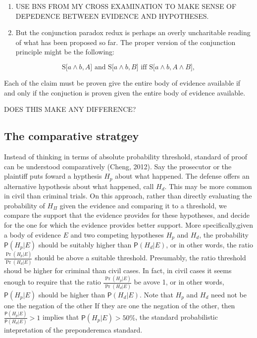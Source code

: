 \documentclass[10pt,dvipsnames,enabledeprecatedfontcommands]{scrartcl}
\newcommand{\et}{\wedge}
\newcommand{\pr}[1]{\mathsf{P}(#1)}
\begin{document}
\begin{enumerate}
\def\labelenumi{(\arabic{enumi})}
\setcounter{enumi}{1}
\item
  USE BNS FROM MY CROSS EXAMINATION TO MAKE SENSE OF DEPEDENCE BETWEEN
  EVIDENCE AND HYPOTHESES.
\item
  But the conjunction paradox redux is perhaps an overly uncharitable
  reading of what has been proposed so far. The proper version of the
  conjunction principle might be the following:
\end{enumerate}

\[\text{S[$a \et b, A$] and S[$a \et b, B$] iff S[$a \wedge b, A\wedge B$]},\]

\noindent
 Each of the claim must be proven give the entire body of evidence
available if and only if the conjuction is proven given the entire body
of evidence available.

DOES THIS MAKE ANY DIFFERENCE?

\subsection{The comparative stratgey}\label{the-comparative-stratgey}

Instead of thinking in terms of absolute probability threshold, standard
of proof can be understood comparatively (Cheng, 2012). Say the
prosecutor or the plaintiff puts foward a hypthesis \(H_p\) about what
happened. The defense offers an alternative hypothesis about what
happened, call \(H_d\). This may be more common in civil than criminal
trials. On this approach, rather than directly evaluating the
probability of \(H_\Pi\) given the evidence and comparing it to a
threshold, we compare the support that the evidence provides for these
hypotheses, and decide for the one for which the evidence provides
better support. More specifically,given a body of evidence \(E\) and two
competing hypotheses \(H_p\) and \(H_d\), the probability
\(\pr{H_p | E}\) should be suitably higher than \(\pr{H_d | E}\), or in
other words, the ratio \(\frac{\Pr(H_p | E)}{\Pr(H_d | E)}\) should be
above a suitable threshold. Presumably, the ratio threshold shoud be
higher for criminal than civil cases. In fact, in civil cases it seems
enough to require that the ratio \(\frac{\Pr(H_p | E)}{\Pr(H_d | E)}\)
be avove 1, or in other words, \(\pr{H_p | E}\) should be higher than
\(\pr{H_d | E}\). Note that \(H_p\) and \(H_d\) need not be one the
negation of the other If they are one the negation of the other, then
\(\frac{\pr{H_p | E}}{\pr{H_d | E}}>1\) implies that
\(\pr{H_p | E}>50\%\), the standard probabilistic intepretation of the
preponderemca standard.
\end{document}
